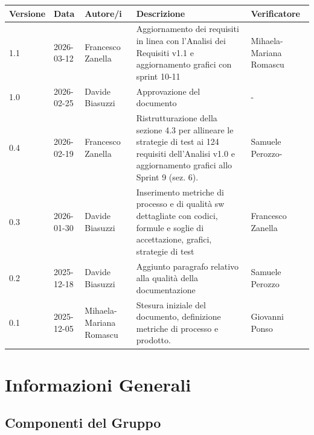 \documentclass[a4paper,11pt,oneside]{scrartcl}
\begin{document}
\begin{center}
\renewcommand{\arraystretch}{1.5}
\begin{tabularx}{\textwidth}{@{}p{}p{}p{}X>{\centering\arraybackslash}p{}@{}}
\toprule
\textbf{Versione} & \textbf{Data} & \textbf{Autore/i} & \textbf{Descrizione} & \textbf{Verificatore} \\
\midrule
1.1 & 2026-03-12 & Francesco Zanella & Aggiornamento dei requisiti in linea con l'Analisi dei Requisiti v1.1 e aggiornamento grafici con sprint 10-11 & Mihaela-Mariana Romascu\\
1.0 & 2026-02-25 & Davide Biasuzzi & Approvazione del documento & -\\
0.4 & 2026-02-19 & Francesco Zanella & Ristrutturazione della sezione 4.3 per allineare le strategie di test ai 124 requisiti dell'Analisi v1.0 e aggiornamento grafici allo Sprint 9 (sez. 6). & Samuele Perozzo-\\
0.3 & 2026-01-30 & Davide Biasuzzi & Inserimento metriche di processo e di qualità sw dettagliate con codici, formule e soglie di accettazione, grafici, strategie di test & Francesco Zanella\\
0.2 & 2025-12-18 & Davide Biasuzzi & Aggiunto paragrafo relativo alla qualità della documentazione & Samuele Perozzo\\
0.1 & 2025-12-05 & Mihaela-Mariana Romascu & Stesura iniziale del documento, definizione metriche di processo e prodotto. & Giovanni Ponso\\
\bottomrule
\end{tabularx}
\end{center}

\newpage
\tableofcontents
\newpage

\section*{Informazioni Generali}

\subsection*{Componenti del Gruppo}
\end{document}
